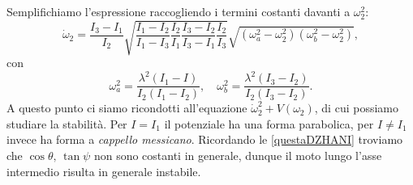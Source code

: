     Semplifichiamo l'espressione raccogliendo i termini costanti davanti a $\omega_2^2$:
    \begin{equation}
        \dot{\omega}_2 =\frac{I_3-I_1}{I_2}\sqrt{\frac{I_1-I_2}{I_1-I_3}\frac{I_2}{I_1} \frac{I_3-I_2}{I_3-I_1}\frac{I_2}{I_3}}\sqrt{(\omega_a^2-\omega_2^2)(\omega_b^2-\omega_2^2)},
    \end{equation}
    con
    \begin{equation}
        \omega_a^2 = \frac{\lambda^2(I_1-I)}{I_2(I_1-I_2)},\quad \omega_b^2=\frac{\lambda^2(I_3-I_2)}{I_2(I_3-I_2)}.
    \end{equation}
    A questo punto ci siamo ricondotti all'equazione $\dot{\omega}_2^2+V(\omega_2)$, di cui possiamo studiare la stabilità. Per $I=I_1$ il potenziale ha una forma parabolica, per $I\neq I_1$ invece ha forma a \emph{cappello messicano}. Ricordando le \eqref{questaDZHANI} troviamo che $\cos\theta,\,\tan\psi$ non sono costanti in generale, dunque il moto lungo l'asse intermedio risulta in generale instabile.
    